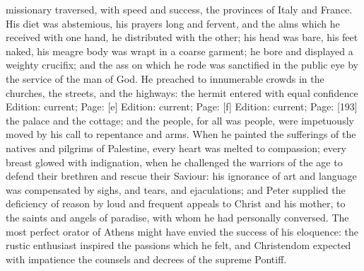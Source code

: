 missionary traversed, with speed and success, the provinces of Italy and France. His diet was abstemious, his prayers long and fervent, and the alms which he received with one hand, he distributed with the other; his head was bare, his feet naked, his meagre body was wrapt in a coarse garment; he bore and displayed a weighty crucifix; and the ass on which he rode was sanctified in the public eye by the service of the man of God. He preached to innumerable crowds in the churches, the streets, and the highways: the hermit entered with equal confidence Edition: current; Page: [e] Edition: current; Page: [f] Edition: current; Page: [193] the palace and the cottage; and the people, for all was people, were impetuously moved by his call to repentance and arms. When he painted the sufferings of the natives and pilgrims of Palestine, every heart was melted to compassion; every breast glowed with indignation, when he challenged the warriors of the age to defend their brethren and rescue their Saviour: his ignorance of art and language was compensated by sighs, and tears, and ejaculations; and Peter supplied the deficiency of reason by loud and frequent appeals to Christ and his mother, to the saints and angels of paradise, with whom he had personally conversed. The most perfect orator of Athens might have envied the success of his eloquence: the rustic enthusiast inspired the passions which he felt, and Christendom expected with impatience the counsels and decrees of the supreme Pontiff.

